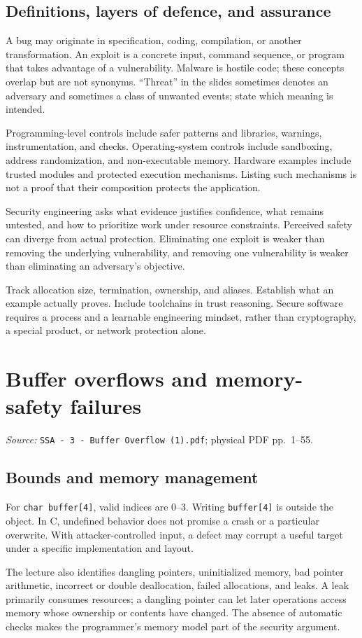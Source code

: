 \documentclass[11pt,a4paper]{article}
\newcommand{\currentmodule}{Contents}
\newcommand{\source}[2]{\textcolor{muted}{\small\textit{Source:} \nolinkurl{#1}; physical PDF pp.~#2.}\par\medskip}
\newcommand{\module}[2]{\par\Needspace{8\baselineskip}\gdef\currentmodule{#1}\section{#1}\label{#2}}
\numberwithin{figure}{section}
\begin{document}
\subsection{Definitions, layers of defence, and assurance}
A bug may originate in specification, coding, compilation, or another transformation. An exploit is a concrete input, command sequence, or program that takes advantage of a vulnerability. Malware is hostile code; these concepts overlap but are not synonyms. ``Threat'' in the slides sometimes denotes an adversary and sometimes a class of unwanted events; state which meaning is intended.

Programming-level controls include safer patterns and libraries, warnings, instrumentation, and checks. Operating-system controls include sandboxing, address randomization, and non-executable memory. Hardware examples include trusted modules and protected execution mechanisms. Listing such mechanisms is not a proof that their composition protects the application.

Security engineering asks what evidence justifies confidence, what remains untested, and how to prioritize work under resource constraints. Perceived safety can diverge from actual protection. Eliminating one exploit is weaker than removing the underlying vulnerability, and removing one vulnerability is weaker than eliminating an adversary's objective.

\begin{takeaway}
Track allocation size, termination, ownership, and aliases. Establish what an example actually proves. Include toolchains in trust reasoning. Secure software requires a process and a learnable engineering mindset, rather than cryptography, a special product, or network protection alone.
\end{takeaway}

\module{Buffer overflows and memory-safety failures}{sec:bo}
\source{SSA - 3 - Buffer Overflow (1).pdf}{1--55}
\subsection{Bounds and memory management}
For \texttt{char buffer[4]}, valid indices are 0--3. Writing \texttt{buffer[4]} is outside the object. In C, undefined behavior does not promise a crash or a particular overwrite. With attacker-controlled input, a defect may corrupt a useful target under a specific implementation and layout.

The lecture also identifies dangling pointers, uninitialized memory, bad pointer arithmetic, incorrect or double deallocation, failed allocations, and leaks. A leak primarily consumes resources; a dangling pointer can let later operations access memory whose ownership or contents have changed. The absence of automatic checks makes the programmer's memory model part of the security argument.
\end{document}
